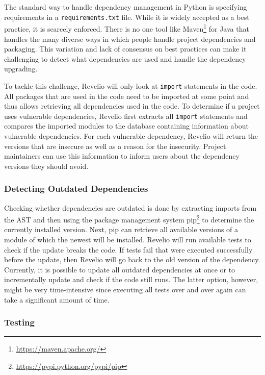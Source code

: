 The standard way to handle dependency management in Python is specifying requirements in a \texttt{requirements.txt} file. While it is widely accepted as a best practice, it is scarcely enforced. There is no one tool like Maven\footnote{\url{https://maven.apache.org/}} for Java that handles the many diverse ways in which people handle project dependencies and packaging. This variation and lack of consensus on best practices can make it challenging to detect what dependencies are used and handle the dependency upgrading. 

To tackle this challenge, Revelio will only look at \texttt{import} statements in the code. All packages that are used in the code need to be imported at some point and thus allows retrieving all dependencies used in the code.
To determine if a project uses vulnerable dependencies, Revelio first extracts all \texttt{import} statements and compares the imported modules to the database containing information about vulnerable dependencies. For each vulnerable dependency, Revelio will return the versions that are insecure as well as a reason for the insecurity. Project maintainers can use this information to inform users about the dependency versions they should avoid.

\subsubsection{Detecting Outdated Dependencies}

Checking whether dependencies are outdated is done by extracting imports from the AST and then using the package management system pip\footnote{\url{https://pypi.python.org/pypi/pip}} to determine the currently installed version. Next, pip can retrieve all available versions of a module of which the newest will be installed. Revelio will run available tests to check if the update breaks the code. If tests fail that were executed successfully before the update, then Revelio will go back to the old version of the dependency. Currently, it is possible to update all outdated dependencies at once or to incrementally update and check if the code still runs. The latter option, however, might be very time-intensive since executing all tests over and over again can take a significant amount of time.


\subsubsection{Testing}\label{sec:testing}

